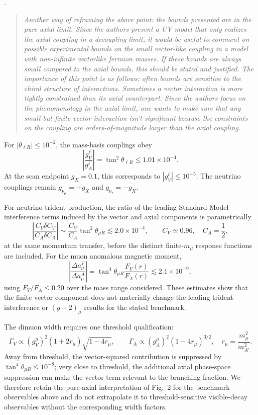 \documentclass[12pt,a4paper]{article}
\begin{document}
\medskip
{}.
\begin{quote}\itshape
Another way of reframing the above point: the bounds presented are in the pure axial limit. Since the authors present a UV model that only realizes the axial coupling in a decoupling limit, it would be useful to comment on possible experimental bounds on the small vector-like coupling in a model with non-infinite vectorlike fermion masses. If these bounds are always small compared to the axial bounds, this should be stated and justified. The importance of this point is as follows: often bounds are sensitive to the chiral structure of interactions. Sometimes a vector interaction is more tightly constrained than its axial counterpart. Since the authors focus on the phenomenology in the axial limit, one wants to make sure that any small-but-finite vector interaction isn't significant because the constraints on the coupling are orders-of-magnitude larger than the axial coupling.
\end{quote}


For \(|\theta_{\ell R}|\leq10^{-2}\), the mass-basis couplings obey
\[
\left|\frac{g_V^\ell}{g_A^\ell}\right|
=\tan^2\theta_{\ell R}\leq1.01\times10^{-4}.
\]
At the scan endpoint \(g_X=0.1\), this corresponds to \(|g_V^\ell|\leq10^{-5}\). The neutrino couplings remain \(g_{\nu_\mu}=+g_X\) and \(g_{\nu_\tau}=-g_X\).

For neutrino trident production, the ratio of the leading Standard-Model interference terms induced by the vector and axial components is parametrically
\[
\left|\frac{C_V\delta C_V}{C_A\delta C_A}\right|
\sim\frac{C_V}{C_A}\tan^2\theta_{\mu R}
\lesssim2.0\times10^{-4},
\qquad C_V\simeq0.96,\quad C_A=\frac12,
\]
at the same momentum transfer, before the distinct finite-\(m_\mu\) response functions are included. For the muon anomalous magnetic moment,
\[
\left|\frac{\Delta a_\mu^{V}}{\Delta a_\mu^{A}}\right|
=\tan^4\theta_{\mu R}\frac{F_V(r)}{F_A(r)}
\lesssim2.1\times10^{-9},
\]
using \(F_V/F_A\leq0.20\) over the mass range considered. These estimates show that the finite vector component does not materially change the leading trident-interference or \((g-2)_\mu\) results for the stated benchmark.

The dimuon width requires one threshold qualification:
\[
\Gamma_V\propto(g_V^\mu)^2(1+2r_\mu)\sqrt{1-4r_\mu},\qquad
\Gamma_A\propto(g_A^\mu)^2(1-4r_\mu)^{3/2},
\quad r_\mu=\frac{m_\mu^2}{m_{A'}^2}.
\]
Away from threshold, the vector-squared contribution is suppressed by \(\tan^4\theta_{\mu R}\leq10^{-8}\); very close to threshold, the additional axial phase-space suppression can make the vector term relevant to the branching fraction. We therefore retain the pure-axial interpretation of Fig.~2 for the benchmark observables above and do not extrapolate it to threshold-sensitive visible-decay observables without the corresponding width factors.
\end{document}
